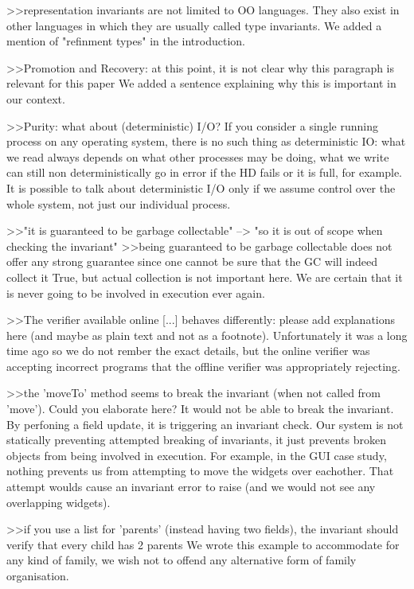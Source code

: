 >>representation invariants are not limited to OO languages. They also exist in other languages in which they are usually called type invariants.
We added a mention of "refinment types" in the introduction.


>>Promotion and Recovery: at this point, it is not clear why this paragraph is relevant for this paper
We added a sentence explaining why this is important in our context.

>>Purity: what about (deterministic) I/O?
If you consider a single running process on any operating system, there is no such thing as deterministic IO:
what we read always depends on what other processes may be doing, what we write can still non deterministically go in error if the HD fails or it is full, for example.
It is possible to talk about deterministic I/O only if we assume control over the whole system, not just our individual process.

>>"it is guaranteed to be garbage collectable" --> "so it is out of scope when checking the invariant" 
>>being guaranteed to be garbage collectable does not offer any strong guarantee since one cannot be sure that the GC will indeed collect it
True, but actual collection is not important here. We are certain that it is never going to be involved in execution ever again.


>>The verifier available online [...] behaves differently: please add explanations here (and maybe as plain text and not as a footnote).
Unfortunately it was a long time ago so we do not rember the exact details, but the online verifier was accepting incorrect programs that the offline verifier was appropriately rejecting.

>>the 'moveTo' method seems to break the invariant (when not called from 'move'). Could you elaborate here?
It would not be able to break the invariant.
By perfoning a field update, it is triggering an invariant check.
Our system is not statically preventing attempted breaking of invariants, it just prevents broken objects from being involved in execution.
For example, in the GUI case study, nothing prevents us from attempting to move the widgets over eachother.
That attempt woulds cause an invariant error to raise (and we would not see any overlapping widgets).

>>if you use a list for 'parents' (instead having two fields), the invariant should verify that every child has 2 parents
We wrote this example to accommodate for any kind of family, we wish not to offend any alternative form of family organisation.


